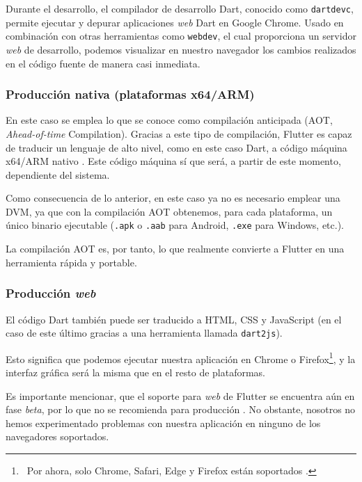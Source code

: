 Durante el desarrollo, el compilador de desarrollo Dart, conocido como \texttt{dartdevc}, permite ejecutar y depurar aplicaciones \emph{web} Dart en Google Chrome. Usado en combinación con otras herramientas como \texttt{webdev}, el cual proporciona un servidor \emph{web} de desarrollo, podemos visualizar en nuestro navegador los cambios realizados en el código fuente de manera casi inmediata.


\subsubsection{Producción nativa (plataformas x64/ARM)}

En este caso se emplea lo que se conoce como compilación anticipada (AOT, \emph{Ahead-of-time} Compilation). Gracias a este tipo de compilación, Flutter es capaz de traducir un lenguaje de alto nivel, como en este caso Dart, a código máquina x64/ARM nativo \cite{aot-wiki}. Este código máquina sí que será, a partir de este momento, dependiente del sistema.

Como consecuencia de lo anterior, en este caso ya no es necesario emplear una DVM, ya que con la compilación AOT obtenemos, para cada plataforma, un único binario ejecutable (\texttt{.apk} o \texttt{.aab} para Android, \texttt{.exe} para Windows, etc.).

La compilación AOT es, por tanto, lo que realmente convierte a Flutter en una herramienta rápida y portable.

\subsubsection{Producción \emph{web}}

El código Dart también puede ser traducido a HTML, CSS y JavaScript (en el caso de este último gracias a una herramienta llamada \texttt{dart2js}).

Esto significa que podemos ejecutar nuestra aplicación en Chrome o Firefox\footnote{\, Por ahora, solo Chrome, Safari, Edge y Firefox están soportados \cite{flutter-web}.}, y la interfaz gráfica será la misma que en el resto de plataformas.

Es importante mencionar, que el soporte para \emph{web} de Flutter se encuentra aún en fase \emph{beta}, por lo que no se recomienda para producción \cite{flutter-web}. No obstante, nosotros no hemos experimentado problemas con nuestra aplicación en ninguno de los navegadores soportados.